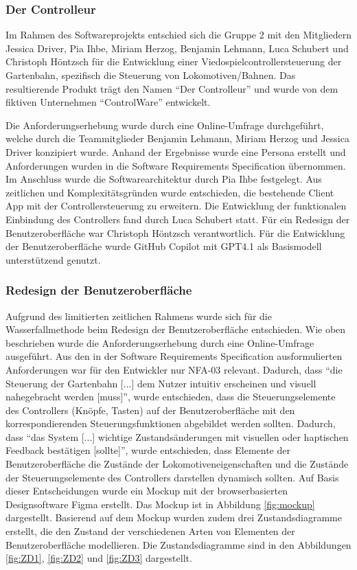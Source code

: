 \documentclass[first=Christoph,last=Hoentzsch,company=Softwareprojekt,location=Dresden,simple, noheader]{baarticle}
\begin{document}
\begin{basimple}
        \subsubsection{Der Controlleur}
        Im Rahmen des Softwareprojekts entschied sich die Gruppe 2 mit den Mitgliedern Jessica Driver, Pia Ihbe, Miriam Herzog, Benjamin Lehmann, Luca Schubert und Christoph Höntzsch für die Entwicklung einer Viedospielcontrollersteuerung der Gartenbahn, spezifisch die Steuerung von Lokomotiven/Bahnen. 
        Das resultierende Produkt trägt den Namen \enquote{Der Controlleur} und wurde von dem fiktiven Unternehmen \enquote{ControlWare} entwickelt.

        Die Anforderungserhebung wurde durch eine Online-Umfrage durchgeführt, welche durch die Teammitglieder Benjamin Lehmann, Miriam Herzog und Jessica Driver konzipiert wurde. Anhand der Ergebnisse wurde eine Persona erstellt und Anforderungen wurden in die Software Requirements Specification übernommen. 
        Im Anschluss wurde die Softwarearchitektur durch Pia Ihbe festgelegt.
        Aus zeitlichen und Komplexitätsgründen wurde entschieden, die bestehende Client App mit der Controllersteuerung zu erweitern.
        Die Entwicklung der funktionalen Einbindung des Controllers fand durch Luca Schubert statt.
        Für ein Redesign der Benutzeroberfläche war Christoph Höntzsch verantwortlich.
        Für die Entwicklung der Benutzeroberfläche wurde GitHub Copilot mit GPT4.1 als Basismodell unterstützend genutzt.

        \subsubsection{Redesign der Benutzeroberfläche}
        Aufgrund des limitierten zeitlichen Rahmens wurde sich für die Wasserfallmethode beim Redesign der Benutzeroberfläche entschieden.
        Wie oben beschrieben wurde die Anforderungserhebung durch eine Online-Umfrage ausgeführt.
        Aus den in der Software Requirements Specification ausformulierten Anforderungen war für den Entwickler nur NFA-03 relevant.
        Dadurch, dass \enquote{die Steuerung der Gartenbahn [...] dem Nutzer intuitiv erscheinen und visuell nahegebracht werden [muss]}, wurde entschieden, dass die Steuerungselemente des Controllers (Knöpfe, Tasten) auf der Benutzeroberfläche mit den korrespondierenden Steuerungsfunktionen abgebildet werden sollten.
        Dadurch, dass \enquote{das System [...] wichtige Zustandsänderungen mit visuellen oder haptischen Feedback bestätigen [sollte]}, wurde entschieden, dass Elemente der Benutzeroberfläche die Zustände der Lokomotiveneigenschaften und die Zustände der Steuerungselemente des Controllers darstellen dynamisch sollten.
        Auf Basis dieser Entscheidungen wurde ein Mockup mit der browserbasierten Designsoftware Figma erstellt.
        Das Mockup ist in Abbildung \ref{fig:mockup} dargestellt.
        Basierend auf dem Mockup wurden zudem drei Zustandsdiagramme erstellt, die den Zustand der verschiedenen Arten von Elementen der Benutzeroberfläche modellieren.
        Die Zustandsdiagramme sind in den Abbildungen \ref{fig:ZD1}, \ref{fig:ZD2} und \ref{fig:ZD3} dargestellt.


\end{basimple}
\end{document}
